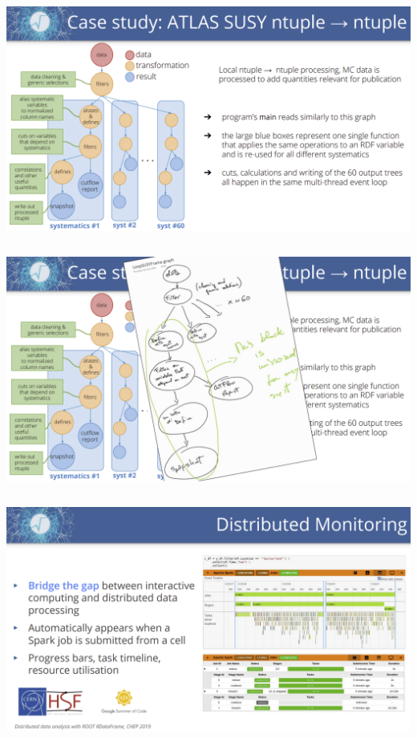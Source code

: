 \documentclass[aspectratio=169]{beamer}
\begin{document}
\begin{frame}{}
\begin{columns}
\includegraphics[width=\linewidth]{img/rdataframe-slide-1.png}
\end{columns}
\end{frame}

\begin{frame}{}
\begin{columns}
\includegraphics[width=\linewidth]{img/rdataframe-slide-2.png}
\end{columns}
\end{frame}

\begin{frame}{}
\begin{columns}
\includegraphics[width=\linewidth]{img/rdataframe-distributed.png}
\end{columns}
\end{frame}
\end{document}
